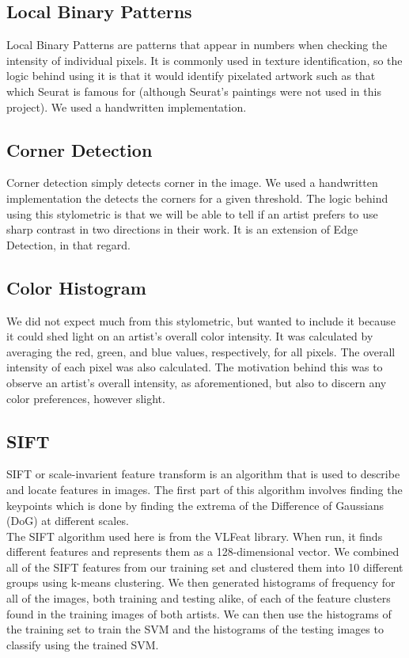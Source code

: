\documentclass{article}
\begin{document}
  \subsection{Local Binary Patterns}
  Local Binary Patterns are patterns that appear in numbers when checking the
  intensity of individual pixels. It is commonly used in texture identification,
  so the logic behind using it is that it would identify pixelated artwork such
  as that which Seurat is famous for (although Seurat's paintings were not used
  in this project). We used a handwritten implementation.

  \subsection{Corner Detection}
  Corner detection simply detects corner in the image. We used a handwritten
  implementation the detects the corners for a given threshold. The logic behind
  using this stylometric is that we will be able to tell if an artist prefers to
  use sharp contrast in two directions in their work. It is an extension of Edge
  Detection, in that regard. \\

  \subsection{Color Histogram}
  We did not expect much from this stylometric, but wanted to include it because
  it could shed light on an artist's overall color intensity. It was calculated
  by averaging the red, green, and blue values, respectively, for all pixels.
  The overall intensity of each pixel was also calculated. The motivation behind
  this was to observe an artist's overall intensity, as aforementioned, but also
  to discern any color preferences, however slight. \\

  \subsection{SIFT}
  SIFT or scale-invarient feature transform is an algorithm that is used to
  describe and locate features in images. The first part of this algorithm
  involves finding the keypoints which is done by finding the extrema of
  the Difference of Gaussians (DoG) at different scales. \\

  The SIFT algorithm used here is from the VLFeat library. When run, it finds
  different features and represents them as a 128-dimensional vector. We combined all of the SIFT features from our training set and clustered them into 10 different groups using k-means
  clustering. We then generated histograms of frequency for all of the images,
  both
  training and testing alike, of each of the feature clusters found in the
  training
  images of both artists. We can then use the histograms of the training set to
  train the SVM and the histograms of the testing images to classify using the
  trained SVM. \\
\end{document}
